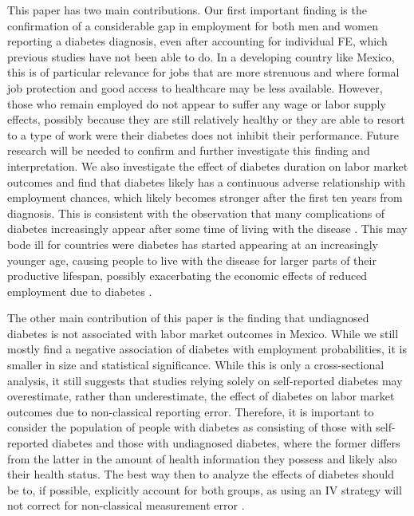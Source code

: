 \documentclass[12pt,english,british]{article}
\begin{document}
This paper has two main contributions. Our first important finding is the confirmation of a considerable gap in employment for both men and women reporting a diabetes diagnosis, even after accounting for individual \ac{FE}, which previous studies have not been able to do. In a developing country like Mexico, this is of particular relevance for jobs that are more strenuous and where formal job protection and good access to healthcare may be less available. However, those who remain employed do not appear to suffer any wage or labor supply effects, possibly because they are still relatively healthy or they are able to resort to a type of work were their diabetes does not inhibit their performance. Future research will be needed to confirm and further investigate this finding and interpretation. We also investigate the effect of diabetes duration on labor market outcomes and find that diabetes likely has a continuous adverse relationship with employment chances, which likely becomes stronger after the first ten years from diagnosis. This is consistent with the observation that many complications of diabetes increasingly appear after some time of living with the disease \citep{Adler2003}. This may bode ill for countries were diabetes has started appearing at an increasingly younger age, causing people to live with the disease for larger parts of their productive lifespan, possibly exacerbating the economic effects of reduced employment due to diabetes \citep{Hu2011}. 

The other main contribution of this paper is the finding that undiagnosed
diabetes is not associated with labor market outcomes in Mexico. While we still mostly find a negative association of diabetes with employment probabilities, it is smaller in size and statistical significance. While this is only a cross-sectional analysis, it still suggests that studies relying solely on self-reported diabetes may overestimate, rather than underestimate, the effect of diabetes on labor market outcomes due to non-classical reporting error. Therefore, it is important to consider the population of people with diabetes as consisting of those with self-reported diabetes and those with undiagnosed diabetes, where the former differs from the latter in the amount of health information they possess and likely also their health status. The best way then to analyze the effects of diabetes should be to, if possible, explicitly account for both groups, as using an \ac{IV} strategy will not correct for non-classical measurement error \citep{Cawley2015}.
\end{document}
